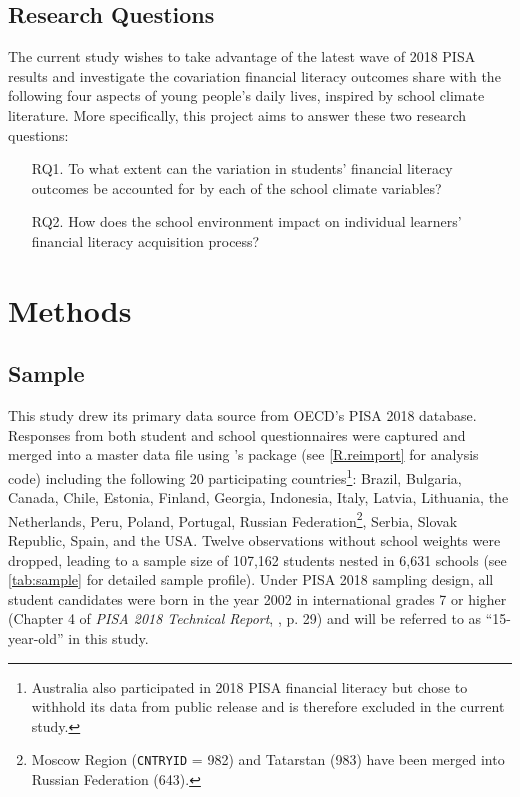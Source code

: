 \documentclass[a4paper,11pt,UKenglish,twoside,openright]{report}\usepackage[]{graphicx}\usepackage[]{color}
\begin{document}
\section{Research Questions}\label{sec:rq}

The current study wishes to take advantage of the latest wave of 2018 PISA results and investigate the covariation financial literacy outcomes share with the following four aspects of young people's daily lives, inspired by school climate literature. More specifically, this project aims to answer these two research questions:
\begin{enumerate}
    \item[RQ1.] To what extent can the variation in students' financial literacy outcomes be accounted for by each of the school climate variables?
    \item[RQ2.] How does the school environment impact on individual learners' financial literacy acquisition process?
\end{enumerate}


\chapter{Methods}
\label{chp:3}

\section{Sample}

This study drew its primary data source from OECD's PISA 2018 database. Responses from both student \parencite{FLdata} and school questionnaires \parencite{SCHdata} were captured and merged into a master data file using \CR's \parencite[Version 4.0.5,][]{R}  package \parencite[Version 2.5,][]{intsvy} (see \cref{R.reimport} for analysis code) including the following 20 participating countries\footnote{Australia also participated in 2018 PISA financial literacy but chose to withhold its data from public release and is therefore excluded in the current study.}: Brazil, Bulgaria, Canada, Chile, Estonia, Finland, Georgia, Indonesia, Italy, Latvia, Lithuania, the Netherlands, Peru, Poland, Portugal, Russian Federation\footnote{Moscow Region (\texttt{CNTRYID} = 982) and Tatarstan (983) have been merged into Russian Federation (643).}, Serbia, Slovak Republic, Spain, and the USA. Twelve observations without school weights were dropped, leading to a sample size of 107,162 students nested in 6,631 schools (see \cref{tab:sample} for detailed sample profile). Under PISA 2018 sampling design, all student candidates were born in the year 2002 in international grades 7 or higher (Chapter 4 of \textit{PISA 2018 Technical Report}, \textcite{PISAtech}, p. 29) and will be referred to as ``15-year-old'' in this study.
\end{document}
